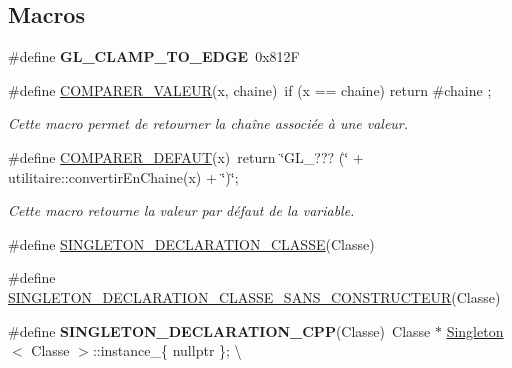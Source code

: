 \subsection*{Macros}
\begin{DoxyCompactItemize}
\item 
\hypertarget{group__utilitaire_gae90f81f48642444b4ba7fa5cacf40569}{\#define {\bfseries G\-L\-\_\-\-C\-L\-A\-M\-P\-\_\-\-T\-O\-\_\-\-E\-D\-G\-E}~0x812\-F}\label{group__utilitaire_gae90f81f48642444b4ba7fa5cacf40569}

\item 
\hypertarget{group__utilitaire_ga849df54224f798741d3fe046180dddfc}{\#define \hyperlink{group__utilitaire_ga849df54224f798741d3fe046180dddfc}{C\-O\-M\-P\-A\-R\-E\-R\-\_\-\-V\-A\-L\-E\-U\-R}(x, chaine)~if (x == chaine) return \#chaine ;}\label{group__utilitaire_ga849df54224f798741d3fe046180dddfc}

\begin{DoxyCompactList}\small\item\em Cette macro permet de retourner la chaîne associée à une valeur. \end{DoxyCompactList}\item 
\hypertarget{group__utilitaire_gacd82c66571930dca394095824ff37a5c}{\#define \hyperlink{group__utilitaire_gacd82c66571930dca394095824ff37a5c}{C\-O\-M\-P\-A\-R\-E\-R\-\_\-\-D\-E\-F\-A\-U\-T}(x)~return \char`\"{}G\-L\-\_\-??? (\char`\"{} + utilitaire\-::convertir\-En\-Chaine(x) + \char`\"{})\char`\"{};}\label{group__utilitaire_gacd82c66571930dca394095824ff37a5c}

\begin{DoxyCompactList}\small\item\em Cette macro retourne la valeur par défaut de la variable. \end{DoxyCompactList}\item 
\#define \hyperlink{group__utilitaire_ga1e4ee9d5709f277c392eea80755d85d0}{S\-I\-N\-G\-L\-E\-T\-O\-N\-\_\-\-D\-E\-C\-L\-A\-R\-A\-T\-I\-O\-N\-\_\-\-C\-L\-A\-S\-S\-E}(Classe)
\item 
\#define \hyperlink{group__utilitaire_ga4e5462d4b058b18eaee177c1f3f50964}{S\-I\-N\-G\-L\-E\-T\-O\-N\-\_\-\-D\-E\-C\-L\-A\-R\-A\-T\-I\-O\-N\-\_\-\-C\-L\-A\-S\-S\-E\-\_\-\-S\-A\-N\-S\-\_\-\-C\-O\-N\-S\-T\-R\-U\-C\-T\-E\-U\-R}(Classe)
\item 
\hypertarget{group__utilitaire_gafd88a0bb7182bc9164ab9200f31e6340}{\#define {\bfseries S\-I\-N\-G\-L\-E\-T\-O\-N\-\_\-\-D\-E\-C\-L\-A\-R\-A\-T\-I\-O\-N\-\_\-\-C\-P\-P}(Classe)~Classe $\ast$ \hyperlink{class_singleton}{Singleton}$<$ Classe $>$\-::instance\-\_\-\{ nullptr \}; \textbackslash{}}\label{group__utilitaire_gafd88a0bb7182bc9164ab9200f31e6340}

\end{DoxyCompactItemize}
